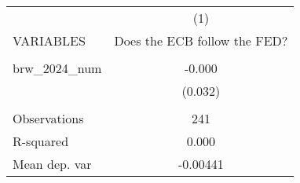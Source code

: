 \documentclass[]{article}
\begin{document}
\begin{tabular}{lc} \hline
 & (1) \\
VARIABLES & Does the ECB follow the FED? \\ \hline
 &  \\
brw\_2024\_num & -0.000 \\
 & (0.032) \\
 &  \\
Observations & 241 \\
R-squared & 0.000 \\
 Mean dep. var & -0.00441 \\ \hline
\end{tabular}
\end{document}
